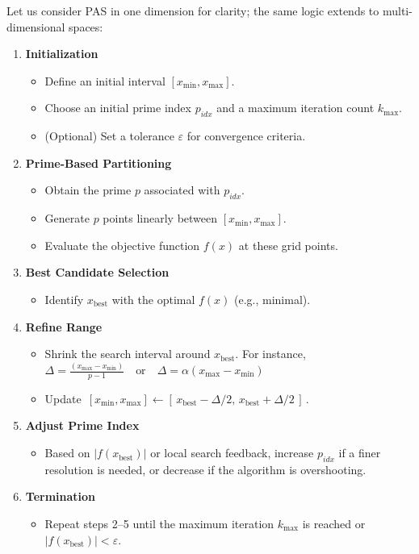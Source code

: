 \documentclass[10pt,twocolumn,letterpaper]{article}
\begin{document}
Let us consider PAS in one dimension for clarity; the same logic extends to multi-dimensional spaces:

\begin{enumerate}
    \item \textbf{Initialization}
    \begin{itemize}
        \item Define an initial interval $[x_{\min}, x_{\max}]$.
        \item Choose an initial prime index $p_{idx}$ and a maximum iteration count $k_{\max}$.
        \item (Optional) Set a tolerance $\varepsilon$ for convergence criteria.
    \end{itemize}
    
    \item \textbf{Prime-Based Partitioning}
    \begin{itemize}
        \item Obtain the prime $p$ associated with $p_{idx}$.
        \item Generate $p$ points linearly between $[x_{\min}, x_{\max}]$.
        \item Evaluate the objective function $f(x)$ at these grid points.
    \end{itemize}
    
    \item \textbf{Best Candidate Selection}
    \begin{itemize}
        \item Identify $x_{\text{best}}$ with the optimal $f(x)$ (e.g., minimal).
    \end{itemize}
    
    \item \textbf{Refine Range}
    \begin{itemize}
        \item Shrink the search interval around $x_{\text{best}}$. For instance,  
        $\Delta = \frac{(x_{\max} - x_{\min})}{p - 1} \quad \text{or} \quad \Delta = \alpha (x_{\max} - x_{\min})$
        \item Update $\,[x_{\min}, x_{\max}] \leftarrow [\,x_{\text{best}} - \Delta/2,\, x_{\text{best}} + \Delta/2\,]\,.$
    \end{itemize}
    
    \item \textbf{Adjust Prime Index}
    \begin{itemize}
        \item Based on $|f(x_{\text{best}})|$ or local search feedback, increase $p_{idx}$ if a finer resolution is needed, or decrease if the algorithm is overshooting.
    \end{itemize}
    
    \item \textbf{Termination}
    \begin{itemize}
        \item Repeat steps 2–5 until the maximum iteration $k_{\max}$ is reached or $|f(x_{\text{best}})| < \varepsilon$.
    \end{itemize}
\end{enumerate}
\end{document}
